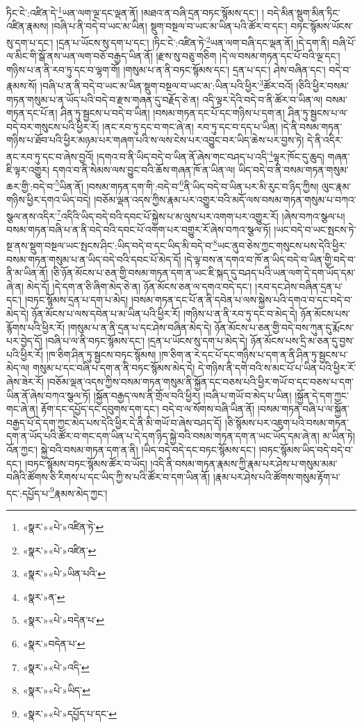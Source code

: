 ཏིང་ངེ་:འཛིན་དེ་\footnote{«སྣར་»«པེ་»འཛིན་ཏེ་}ཡན་ལག་ལྔ་དང་ལྡན་ནོ། །མཐའ་ན་བཞི་དྲན་བཏང་སྙོམས་དང་། །
བདེ་མིན་སྡུག་མིན་ཏིང་འཛིན་རྣམས། །བཞི་པ་ནི་བདེ་བ་ཡང་མ་ཡིན། སྡུག་བསྔལ་བ་ཡང་མ་ཡིན་པའི་ཚོར་བ་དང་། བཏང་སྙོམས་ཡོངས་སུ་དག་པ་དང་། །དྲན་པ་ཡོངས་སུ་དག་པ་དང་། །ཏིང་ངེ་:འཛིན་ཏེ་\footnote{«སྣར་»«པེ་»འཛིན་}ཡན་ལག་བཞི་དང་ལྡན་ནོ། །དེ་དག་ནི། བཞི་པོ་ལ་མིང་གི་སྒོ་ནས་ཡན་ལག་བཅོ་བརྒྱད་ཡིན་ནོ། །རྫས་སུ་བཅུ་གཅིག །དེ་ལ་བསམ་གཏན་དང་པོ་བའི་ལྔ་དང་། གཉིས་པ་ན་ནི་རབ་ཏུ་དང་བ་ལྷག་གོ། །གསུམ་པ་ན་ནི་བཏང་སྙོམས་དང་། དྲན་པ་དང་། ཤེས་བཞིན་དང་། བདེ་བ་རྣམས་སོ། །བཞི་པ་ན་ནི་བདེ་བ་ཡང་མ་ཡིན་སྡུག་བསྔལ་བ་ཡང་མ་:ཡིན་པའི་ཕྱིར་\footnote{«སྣར་»«པེ་»ཡིན་པའི་}ཚོར་བའོ། །ཅིའི་ཕྱིར་བསམ་གཏན་གསུམ་པ་ན་ཡོད་པའི་བདེ་བ་རྫས་གཞན་དུ་བརྗོད་ཅེ་ན། འདི་ལྟར་དེའི་བདེ་བ་ནི་ཚོར་བ་ཡིན་ལ། བསམ་གཏན་དང་པོ་ན། ཤིན་ཏུ་སྦྱངས་པ་བདེ་བ་ཡིན། །བསམ་གཏན་དང་པོ་དང་གཉིས་པ་དག་ན། ཤིན་ཏུ་སྦྱངས་པ་ལ་བདེ་བར་གསུངས་པའི་ཕྱིར་རོ། །ནང་རབ་ཏུ་དང་བ་གང་ཞེ་ན། རབ་ཏུ་དང་བ་དད་པ་ཡིན། །དེ་ནི་བསམ་གཏན་གཉིས་པ་ཐོབ་པའི་ཕྱིར་མཉམ་པར་གཞག་པའི་ས་ལས་ངེས་པར་འབྱུང་བར་ཡིད་ཆེས་པར་བྱས་ཏེ། དེ་ནི་འདིར་ནང་རབ་ཏུ་དང་བ་ཞེས་བྱའོ། །དགའ་བ་ནི་ཡིད་བདེ་བ་ཡིན་ནོ་ཞེས་གང་བཤད་པ་འདི་\footnote{«སྣར་»ན་}ལྟར་ཁོང་དུ་ཆུད། གཞན་ཇི་ལྟར་འགྱུར། དགའ་བ་ནི་སེམས་ལས་བྱུང་བའི་ཆོས་གཞན་ཁོ་ན་ཡིན་ལ། ཡིད་བདེ་བ་ནི་བསམ་གཏན་གསུམ་ཆར་གྱི་:བདེ་བ་\footnote{«སྣར་»«པེ་»བདེན་པ་}ཡིན་ནོ། །བསམ་གཏན་དག་གི་:བདེ་བ་\footnote{«སྣར་»བདེན་པ་}ནི་ཡིད་བདེ་བ་ཡིན་པར་མི་རུང་བ་ཉིད་ཀྱིས། ལུང་རྣམ་གཉིས་ཕྱིར་དགའ་ཡིད་བདེ། །བཅོམ་ལྡན་འདས་ཀྱིས་རྣམ་པར་འགྱུར་བའི་མདོ་ལས་བསམ་གཏན་གསུམ་པ་བཀའ་སྩལ་ནས་འདིར་\footnote{«སྣར་»«པེ་»འདི་}འདིའི་ཡིད་བདེ་བའི་དབང་པོ་སྐྱེས་པ་མ་ལུས་པར་འགག་པར་འགྱུར་རོ། །ཞེས་བཀའ་སྩལ་པ། བསམ་གཏན་བཞི་པ་ན་ནི་བདེ་བའི་དབང་པོ་འགག་པར་བགྱུར་རོ་ཞེས་བཀའ་སྩལ་ཏོ། །ཡང་བདེ་བ་ཡང་སྤངས་ཏེ་སྔ་ནས་སྡུག་བསྔལ་ཡང་སྤངས་ཤིང་:ཡིད་བདེ་བ་དང་ཡིད་མི་བདེ་བ་\footnote{«སྣར་»«པེ་»ཡིད་}ཡང་ནུབ་ཅེས་ཀྱང་གསུངས་པས་དེའི་ཕྱིར་བསམ་གཏན་གསུམ་པ་ན་ཡིད་བདེ་བའི་དབང་པོ་མེད་དོ། །དེ་ལྟ་བས་ན་དགའ་བ་ཁོ་ན་ཡིད་བདེ་བ་ཡིན་གྱི་བདེ་བ་ནི་མ་ཡིན་ནོ། །ཅི་ཉོན་མོངས་པ་ཅན་གྱི་བསམ་གཏན་དག་ན་ཡང་ཇི་སྐད་དུ་བཤད་པའི་ཡན་ལག་དེ་དག་ཡོད་དམ་ཞེ་ན། མེད་དོ། །དེ་དག་ན་ཅི་ཞིག་མེད་ཅེ་ན། ཉོན་མོངས་ཅན་ལ་དགའ་བདེ་དང་། །རབ་དང་ཤེས་བཞིན་དྲན་པ་དང་། །བཏང་སྙོམས་དྲན་པ་དག་པ་མེད། །བསམ་གཏན་དང་པོ་ན་ནི་དབེན་པ་ལས་སྐྱེས་པའི་དགའ་བ་དང་བདེ་བ་མེད་དེ། ཉོན་མོངས་པ་ལས་དབེན་པ་མ་ཡིན་པའི་ཕྱིར་རོ། །གཉིས་པ་ན་ནི་རབ་ཏུ་དང་བ་མེད་དེ། ཉོན་མོངས་པས་རྙོགས་པའི་ཕྱིར་རོ། །གསུམ་པ་ན་ནི་དྲན་པ་དང་ཤེས་བཞིན་མེད་དེ། ཉོན་མོངས་པ་ཅན་གྱི་བདེ་བས་ཀུན་དུ་རྨོངས་པར་བྱེད་དོ། །བཞི་པ་ལ་ནི་བཏང་སྙོམས་དང་། །དྲན་པ་ཡོངས་སུ་དག་པ་མེད་དེ། ཉོན་མོངས་པས་དྲི་མ་ཅན་དུ་བྱས་པའི་ཕྱིར་རོ། །ཁ་ཅིག་ཤིན་ཏུ་སྦྱངས་བཏང་སྙོམས། །ཁ་ཅིག་ན་རེ་དང་པོ་དང་གཉིས་པ་དག་ན་ནི་ཤིན་ཏུ་སྦྱངས་པ་མེད་ལ། གསུམ་པ་དང་བཞི་པ་དག་ན་ནི་བཏང་སྙོམས་མེད་དེ། དེ་གཉིས་ནི་དགེ་བའི་ས་མང་པོ་པ་ཡིན་པའི་ཕྱིར་རོ་ཞེས་ཟེར་རོ། །བཅོམ་ལྡན་འདས་ཀྱིས་བསམ་གཏན་གསུམ་ནི་སྐྱོན་དང་བཅས་པའི་ཕྱིར་གཡོ་བ་དང་བཅས་པ་དག་ཡིན་ནོ་ཞེས་བཀའ་སྩལ་ཏོ། །སྐྱོན་བརྒྱད་ལས་ནི་གྲོལ་བའི་ཕྱིར། །བཞི་པ་གཡོ་བ་མེད་པ་ཡིན། །སྐྱོན་དེ་དག་ཀྱང་གང་ཞེ་ན། རྟོག་དང་དཔྱོད་དང་དབུགས་དག་དང་། བདེ་བ་ལ་སོགས་བཞི་ཡིན་ནོ། །བསམ་གཏན་བཞི་པ་ལ་སྐྱོན་བརྒྱད་པོ་དེ་དག་ཀྱང་མེད་པས་དེའི་ཕྱིར་དེ་ནི་མི་གཡོ་བ་ཞེས་བཤད་དོ། །ཅི་སྙོམས་པར་འཇུག་པའི་བསམ་གཏན་དག་ན་ཡོད་པའི་ཚོར་བ་གང་དག་ཡིན་པ་དེ་དག་ཉིད་སྐྱེ་བའི་བསམ་གཏན་དག་ན་ཡང་ཡོད་དམ་ཞེ་ན། མ་ཡིན་ཏེ། འོན་ཀྱང་། སྐྱེ་བའི་བསམ་གཏན་དག་ན་ནི། །ཡིད་བདེ་བདེ་དང་བཏང་སྙོམས་དང་། །བཏང་སྙོམས་ཡིད་བདེ་བདེ་བ་དང་། །བཏང་སྙོམས་བཏང་སྙོམས་ཚོར་བ་ཡོད། །འདི་ནི་བསམ་གཏན་རྣམས་ཀྱི་རྣམ་པར་ཤེས་པ་གསུམ་མམ་བཞིའི་ཚོགས་ཅི་རིགས་པ་དང་ཡིད་ཀྱི་ས་པའི་ཚོར་བ་དག་ཡིན་ནོ། །རྣམ་པར་ཤེས་པའི་ཚོགས་གསུམ་རྟོག་པ་དང་:དཔྱོད་པ་\footnote{«སྣར་»«པེ་»དཔྱོད་པ་དང་}རྣམས་མེད་ཀྱང་། 